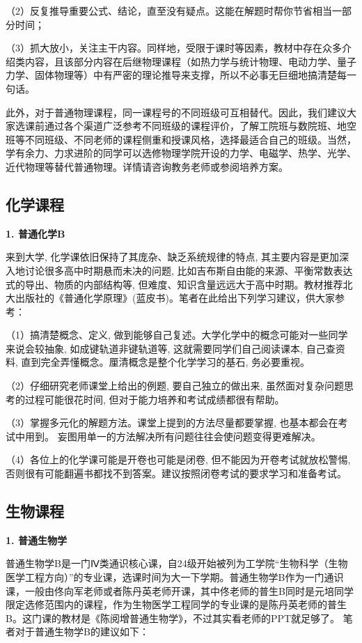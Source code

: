 \documentclass[11pt,oneside]{book}
\begin{document}
（2）反复推导重要公式、结论，直至没有疑点。这能在解题时帮你节省相当一部分时间；

（3）抓大放小，关注主干内容。同样地，受限于课时等因素，教材中存在众多介绍类内容，且该部分内容在后继物理课程（如热力学与统计物理、电动力学、量子力学、固体物理等）中有严密的理论推导来支撑，所以不必事无巨细地搞清楚每一句话。

\vspace{20pt}

此外，对于普通物理课程，同一课程号的不同班级可互相替代。因此，我们建议大家选课前通过各个渠道广泛参考不同班级的课程评价，了解工院班与数院班、地空班等不同班级、不同老师的课程侧重和授课风格，选择最适合自己的班级。当然，学有余力、力求进阶的同学可以选修物理学院开设的力学、电磁学、热学、光学、近代物理等替代普通物理。详情请咨询教务老师或参阅培养方案。

\subsection{化学课程}

\textbf{1. 普通化学B}

来到大学, 化学课依旧保持了其庞杂、缺乏系统规律的特点, 其主要内容是更加深入地讨论很多高中时期悬而未决的问题, 比如吉布斯自由能的来源、平衡常数表达式的导出、物质的内部结构等, 但难度、知识含量远远大于高中时期。教材推荐北大出版社的《普通化学原理》(蓝皮书)。笔者在此给出下列学习建议，供大家参考：

（1）搞清楚概念、定义, 做到能够自己复述。大学化学中的概念可能对一些同学来说会较抽象, 如成键轨道非键轨道等, 这就需要同学们自己阅读课本, 自己查资料, 直到完全弄懂概念。厘清概念是整个化学学习的基石, 务必要重视。

（2）仔细研究老师课堂上给出的例题, 要自己独立的做出来, 虽然面对复杂问题思考的过程可能很花时间, 但对于能力培养和考试成绩都很有帮助。

（3）掌握多元化的解题方法。课堂上提到的方法尽量都要掌握, 也基本都会在考试中用到。 妄图用单一的方法解决所有问题往往会使问题变得更难解决。

（4）各位上的化学课可能是开卷也可能是闭卷, 但不能因为开卷考试就放松警惕, 否则很有可能翻遍书都找不到答案。建议按照闭卷考试的要求学习和准备考试。


\subsection{生物课程}

\textbf{1. 普通生物学}

普通生物学B是一门Ⅳ类通识核心课，自24级开始被列为工学院“生物科学（生物医学工程方向）”的专业课，选课时间为大一下学期。普通生物学B作为一门通识课，一般由佟向军老师或者陈丹英老师开课，其中佟老师的普生B同时是元培同学限定选修范围内的课程，作为生物医学工程同学的专业课的是陈丹英老师的普生B。这门课的教材是《陈阅增普通生物学》，不过其实看老师的PPT就足够了。
笔者对于普通生物学B的建议如下：
\end{document}
